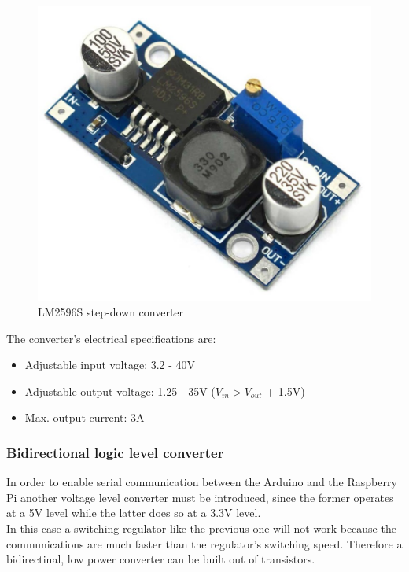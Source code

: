 			\begin{figure}[H]
					\centering
					\includegraphics[scale=0.2]{images/ProjectComponents/buck.jpg}
					\caption{LM2596S step-down converter }
					\label{step-down}
			\end{figure}
			\bigskip

		The converter's electrical specifications are:
			\begin{itemize}
				\item Adjustable input voltage: 3.2 - 40V
				\item Adjustable output voltage: 1.25 - 35V ($V_{in} > V_{out}$ + 1.5V)       
				\item Max. output current: 3A
			\end{itemize}

	\subsubsection{Bidirectional logic level converter}

		In order to enable serial communication between the Arduino and the Raspberry Pi another voltage level converter must be introduced, since the former operates at a 5V level while the latter does so at a 3.3V level.\\

		In this case a switching regulator like the previous one will not work because the communications are much faster than the regulator's switching speed. Therefore a bidirectinal, low power converter can be built out of transistors.\\

